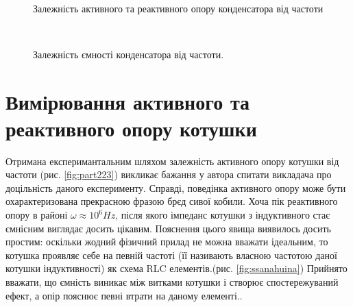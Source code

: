 \begin{figure}[h]
\begin{minipage}[h]{0.47\linewidth}
        \\
    \end{minipage}
    \caption{Залежність активного та реактивного опору конденсатора від частоти}
    \label{fig:part222}
\end{figure}

\begin{figure}[h]
     \\
    \caption{Залежність ємності конденсатора від частоти.}
    \label{fig:part2C}
\end{figure}

\section{Вимірювання активного та реактивного опору котушки}

Отримана експеримантальним шляхом залежність активного опору котушки від частоти (рис. \ref{fig:part223}) викликає бажання у автора спитати викладача про доцільність даного експерименту. Справді, поведінка активного опору може бути охарактеризована прекрасною фразою брєд сивої кобили. Хоча пік реактивного опору в районі $\omega \approx 10^6 Hz$, після якого імпеданс котушки з індуктивного стає ємнісним виглядає досить цікавим. Пояснення цього явища виявилось досить простим: оскільки жодний фізичний прилад не можна вважати ідеальним, то котушка проявляє себе на певній частоті (її називають власною частотою даної котушки індуктивності) як схема RLC елементів.(рис. \ref{fig:ssanahuina}) Прийнято вважати, що ємність виникає між витками котушки і створює спостережуваний ефект, а опір пояснює певні втрати на даному елементі.\cite{huina}.

